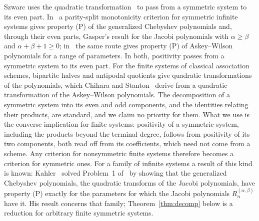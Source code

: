 Szwarc uses the quadratic transformation~\cite[\S3.5]{szwarc} to pass from a symmetric system to its even part. In~\cite{szwarc1992} a parity-split monotonicity criterion for symmetric infinite systems gives property (P) of the generalized Chebyshev polynomials and, through their even parts, Gasper's result for the Jacobi polynomials with $\alpha\geq\beta$ and $\alpha+\beta+1\geq0$; in~\cite{szwarc1996} the same route gives property (P) of Askey--Wilson polynomials for a range of parameters. In both, positivity passes from a symmetric system to its even part. For the finite systems of classical association schemes, bipartite halves and antipodal quotients give quadratic transformations of the polynomials, which Chihara and Stanton~\cite{chiharastanton} derive from a quadratic transformation of the Askey--Wilson polynomials. The decomposition of a symmetric system into its even and odd components, and the identities relating their products, are standard, and we claim no priority for them. What we use is the converse implication for finite systems: positivity of a symmetric system, including the products beyond the terminal degree, follows from positivity of its two components, both read off from its coefficients, which need not come from a scheme. Any criterion for nonsymmetric finite systems therefore becomes a criterion for symmetric ones. For a family of infinite systems a result of this kind is known: Kahler~\cite{kahler} solved Problem~1 of~\cite[\S5]{szwarc} by showing that the generalized Chebyshev polynomials, the quadratic transforms of the Jacobi polynomials, have property (P) exactly for the parameters for which the Jacobi polynomials $R_n^{(\alpha,\beta)}$ have it. His result concerns that family; Theorem~\ref{thm:decomp} below is a reduction for arbitrary finite symmetric systems.

